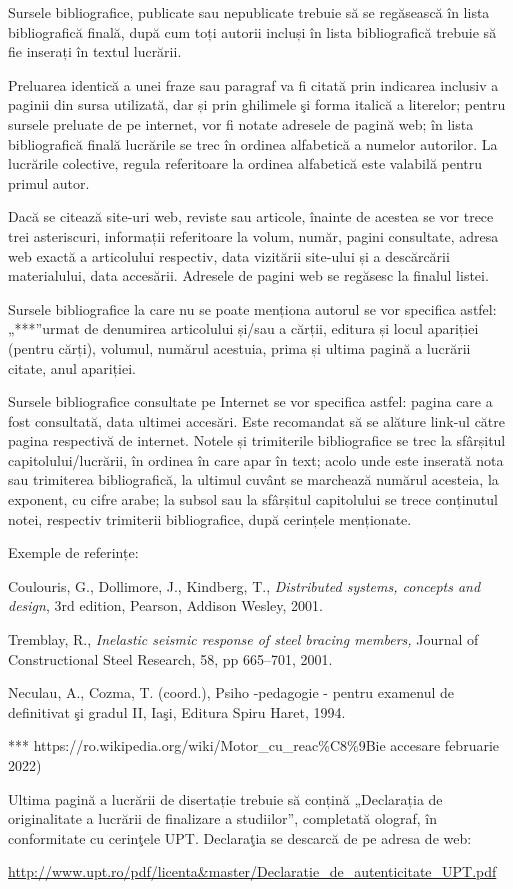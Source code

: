 \documentclass[
]{article}
\begin{document}
Sursele bibliografice, publicate sau nepublicate trebuie să se
regăsească în lista bibliografică finală, după cum toți autorii incluși
în lista bibliografică trebuie să fie inserați în textul lucrării.

Preluarea identică a unei fraze sau paragraf va fi citată prin indicarea
inclusiv a paginii din sursa utilizată, dar și prin ghilimele şi forma
italică a literelor; pentru sursele preluate de pe internet, vor fi
notate adresele de pagină web; în lista bibliografică finală lucrările
se trec în ordinea alfabetică a numelor autorilor. La lucrările
colective, regula referitoare la ordinea alfabetică este valabilă pentru
primul autor.

Dacă se citează site-uri web, reviste sau articole, înainte de acestea
se vor trece trei asteriscuri, informații referitoare la volum, număr,
pagini consultate, adresa web exactă a articolului respectiv, data
vizitării site-ului și a descărcării materialului, data accesării.
Adresele de pagini web se regăsesc la finalul listei.

Sursele bibliografice la care nu se poate menționa autorul se vor
specifica astfel: „***''urmat de denumirea articolului și/sau a cărții,
editura și locul apariției (pentru cărți), volumul, numărul acestuia,
prima și ultima pagină a lucrării citate, anul apariției.

Sursele bibliografice consultate pe Internet se vor specifica astfel:
pagina care a fost consultată, data ultimei accesări. Este recomandat să
se alăture link-ul către pagina respectivă de internet. Notele și
trimiterile bibliografice se trec la sfârșitul capitolului/lucrării, în
ordinea în care apar în text; acolo unde este inserată nota sau
trimiterea bibliografică, la ultimul cuvânt se marchează numărul
acesteia, la exponent, cu cifre arabe; la subsol sau la sfârșitul
capitolului se trece conținutul notei, respectiv trimiterii
bibliografice, după cerințele menționate.

Exemple de referințe:

Coulouris, G., Dollimore, J., Kindberg, T., \emph{Distributed systems,
concepts and design}, 3rd edition, Pearson, Addison Wesley, 2001.

Tremblay, R., \emph{Inelastic seismic response of steel bracing
members,} Journal of Constructional Steel Research, 58, pp 665--701,
2001.

Neculau, A., Cozma, T. (coord.), Psiho -pedagogie - pentru examenul de
definitivat şi gradul II, Iaşi, Editura Spiru Haret, 1994.

*** https://ro.wikipedia.org/wiki/Motor\_cu\_reac\%C8\%9Bie accesare
februarie 2022)

Ultima pagină a lucrării de disertație trebuie să conțină „Declarația de
originalitate a lucrării de finalizare a studiilor'', completată
olograf, în conformitate cu cerinţele UPT. Declaraţia se descarcă de pe
adresa de web:

\url{http://www.upt.ro/pdf/licenta\&master/Declaratie_de_autenticitate_UPT.pdf}
\end{document}

